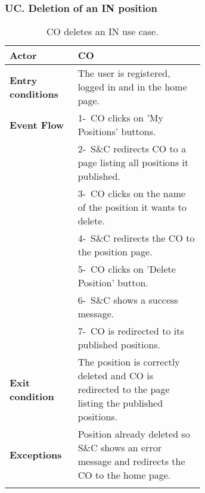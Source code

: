 \subsubsection*{UC\cuc . Deletion of an IN position}
\begin{center}
    \begin{longtable}{|l|p{0.65\linewidth}|}
        \hline
        \textbf{Actor}            & CO \\
        \hline
        \textbf{Entry conditions} & The user is registered, logged in and in the home page.\\
        \hline
        \textbf{Event Flow}       & 1-\ CO clicks on 'My Positions' buttons. \\
        & 2-\ S\&C redirects CO to a page listing all positions it published. \\
        & 3-\ CO clicks on the name of the position it wants to delete. \\
        & 4-\ S\&C redirects the CO to the position page.\\
        & 5-\ CO clicks on 'Delete Position' button. \\
        & 6-\ S\&C shows a success message. \\
        & 7-\ CO is redirected to its published positions. \\
        \hline
        \textbf{Exit condition}   &  The position is correctly deleted and CO is redirected to the page listing the published positions. \\
        \hline
        \textbf{Exceptions}       & Position already deleted so S\&C shows an error message and redirects the CO to the home page. \\
        \hline
        \caption{CO deletes an IN use case.}
        \label{tab: cp_use_case}
    \end{longtable}
\end{center}


